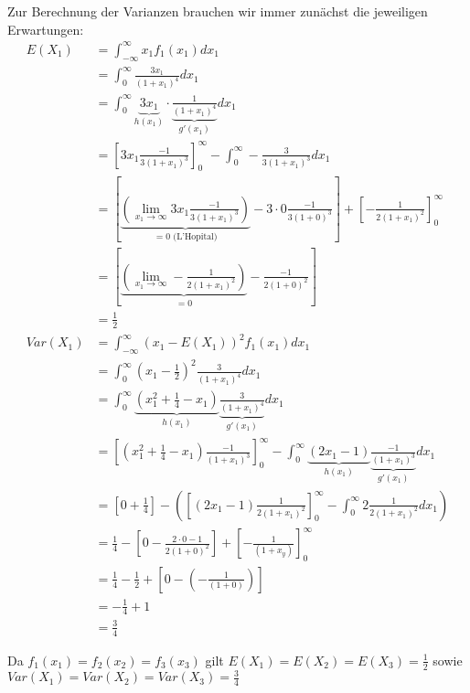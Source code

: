 \documentclass{article}
\begin{document}
Zur Berechnung der Varianzen brauchen wir immer zunächst die jeweiligen Erwartungen:
\begin{align*}
    E(X_1) &= \int_{-\infty}^{\infty} x_1 f_1(x_1) dx_1 \\
    &= \int_{0}^{\infty} \frac{3x_1}{(1+x_1)^4} dx_1 \\
    &= \int_{0}^{\infty} \underbrace{3x_1}_{h(x_1)} \cdot \underbrace{\frac{1}{(1 + x_1)^4}}_{g'(x_1)} dx_1 \\
    &= \left[3x_1 \frac{-1}{3(1+x_1)^3}\right]_0^{\infty} - \int_{0}^{\infty} - \frac{3}{3(1+x_1)^3} dx_1 \\
    &= \left[\underbrace{\left(\lim_{x_1 \rightarrow \infty} 3x_1 \frac{-1}{3(1+x_1)^3} \right)}_{= 0 \text{ (L'Hopital)}} - 3 \cdot0 \frac{-1}{3(1+0)^3}\right] + \left[-\frac{1}{2(1 + x_1)^2}\right]^{\infty}_0 \\
    &= \left[\underbrace{\left(\lim_{x_1 \rightarrow \infty} -\frac{1}{2(1+ x_1)^2}\right)}_{=0} - \frac{-1}{2(1+0)^2}\right] \\
    &= \frac{1}{2} \\ 
    Var(X_1) &= \int_{-\infty}^{\infty} (x_1 - E(X_1))^2 f_1(x_1) dx_1 \\ 
    &= \int_{0}^{\infty}(x_1 - \frac{1}{2})^2 \frac{3}{(1+x_1)^4} dx_1 \\
    &= \int_{0}^{\infty}\underbrace{(x_1^2 + \frac{1}{4}- x_1)}_{h(x_1)}\underbrace{\frac{3}{(1+ x_1)^4}}_{g'(x_1)}dx_1 \\
    &= \left[(x_1^2 + \frac{1}{4}-  x_1)\frac{-1}{(1+x_1)^3} \right]_0^{\infty} - \int_{0}^{\infty}\underbrace{(2x_1-1)}_{h(x_1)}\underbrace{\frac{-1}{(1+x_1)^3}}_{g'(x_1)} dx_1 \\
    &= \left[0 + \frac{1}{4}\right] - \left(\left[(2x_1 -1)\frac{1}{2(1+x_1)^2}\right]_0^{\infty} - \int_0^{\infty}2\frac{1}{2(1 + x_1)^2}dx_1\right) \\
    &= \frac{1}{4} - \left[0 - \frac{2 \cdot 0 - 1}{2(1+ 0 )^2}\right] + \left[-\frac{1}{(1+x_y)}\right]_0^{\infty} \\
    &= \frac{1}{4} - \frac{1}{2} + \left[0 - (-\frac{1}{(1+0)})\right] \\
    &= -\frac{1}{4} + 1 \\
    &= \frac{3}{4}
\end{align*}

Da $f_{1}(x_1) = f_{2}(x_2) = f_3(x_3)$ gilt $E(X_1) = E(X_2) = E(X_3) = \frac{1}{2}$ sowie $Var(X_1) = Var(X_2) = Var(X_3) = \frac{3}{4}$ \\
\end{document}
